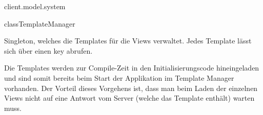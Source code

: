 \begin{texdocpackage}{client.model.system}
\begin{texdocclass}{class}{TemplateManager}
\label{texdoclet:edu.kit.informatik.studyplan.client.model.system.TemplateManager}
\begin{texdocclassintro}
Singleton, welches die Templates für die Views verwaltet. Jedes Template
 lässt sich über einen key abrufen.\texdocbr{}

 Die Templates werden zur Compile-Zeit in den Initialisierungscode
 hineingeladen und sind somit bereits beim Start der Applikation im Template
 Manager vorhanden. Der Vorteil dieses Vorgehens ist, dass man beim Laden der
 einzelnen Views nicht auf eine Antwort vom Server (welche das Template
 enthält) warten muss.\end{texdocclassintro}
\begin{texdocclassconstructors}
\end{texdocclassconstructors}
\begin{texdocclassmethods}
\end{texdocclassmethods}
\end{texdocclass}


\end{texdocpackage}



